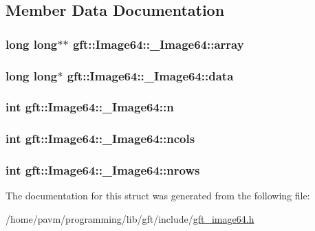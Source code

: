 \subsection{Member Data Documentation}
\hypertarget{structgft_1_1Image64_1_1__Image64_a5a8005455e45847975759eb51412d340}{
\subsubsection[{array}]{\setlength{\rightskip}{0pt plus 5cm}long long$\ast$$\ast$ gft\-::\-Image64\-::\-\_\-\-Image64\-::array}}\label{structgft_1_1Image64_1_1__Image64_a5a8005455e45847975759eb51412d340}
\hypertarget{structgft_1_1Image64_1_1__Image64_a0c78dfc1f22f84c7c1dc854d0e33bbc0}{
\subsubsection[{data}]{\setlength{\rightskip}{0pt plus 5cm}long long$\ast$ gft\-::\-Image64\-::\-\_\-\-Image64\-::data}}\label{structgft_1_1Image64_1_1__Image64_a0c78dfc1f22f84c7c1dc854d0e33bbc0}
\hypertarget{structgft_1_1Image64_1_1__Image64_a7fdc0d8158f088dc04bf35e3039d449f}{
\subsubsection[{n}]{\setlength{\rightskip}{0pt plus 5cm}int gft\-::\-Image64\-::\-\_\-\-Image64\-::n}}\label{structgft_1_1Image64_1_1__Image64_a7fdc0d8158f088dc04bf35e3039d449f}
\hypertarget{structgft_1_1Image64_1_1__Image64_a7425ad4e26726e6472acbe75e1ea9290}{
\subsubsection[{ncols}]{\setlength{\rightskip}{0pt plus 5cm}int gft\-::\-Image64\-::\-\_\-\-Image64\-::ncols}}\label{structgft_1_1Image64_1_1__Image64_a7425ad4e26726e6472acbe75e1ea9290}
\hypertarget{structgft_1_1Image64_1_1__Image64_a80d241238b4a992e8429517ab9725397}{
\subsubsection[{nrows}]{\setlength{\rightskip}{0pt plus 5cm}int gft\-::\-Image64\-::\-\_\-\-Image64\-::nrows}}\label{structgft_1_1Image64_1_1__Image64_a80d241238b4a992e8429517ab9725397}


The documentation for this struct was generated from the following file\-:\begin{DoxyCompactItemize}
\item 
/home/pavm/programming/lib/gft/include/\hyperlink{gft__image64_8h}{gft\-\_\-image64.\-h}\end{DoxyCompactItemize}
